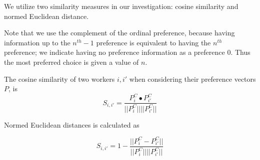 We utilize two similarity measures in our investigation: cosine similarity and normed Euclidean distance.

Note that we use the complement of the ordinal preference, because having information up to the  $n^{th} - 1$ preference is equivalent to having the $n^{th}$ preference; we indicate having no preference information as a preference 0. Thus the most preferred choice is given a value of $n$. 

The cosine similarity of two workers $i, i'$ when considering their preference vectors $P$, is
\[S_{i, i'} = \frac{P^C_{i} \bullet P^C_{i'}}{||P^C_i|| ||P^C_{i'}||}\]

Normed Euclidean distances is calculated as

\[S_{i, i'} = 1- \frac{||P^C_i - P^C_{i'}||}{||P^C_i|| ||P^C_{i'}||}\]

